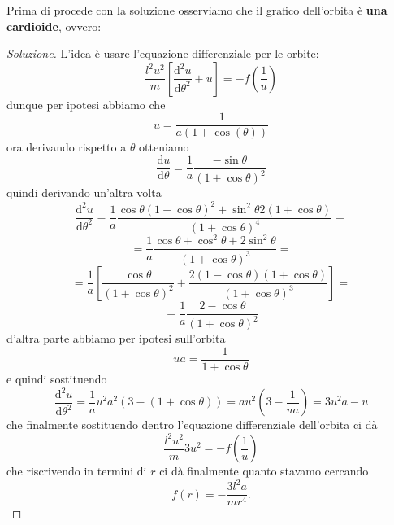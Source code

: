 \documentclass[11pt]{scrartcl}
\newcommand{\dif}{\text{d}}
\begin{document}
	\begin{sol}
		Prima di procede con la soluzione osserviamo che il grafico dell'orbita è \textbf{una cardioide}, ovvero:
		\begin{center}
		\end{center}
		\begin{proof}[Soluzione]
			L'idea è usare l'equazione differenziale per le orbite:
			$$\frac{l^2u^2}{m}\left[\frac{\dif^2 u}{\dif \theta^2}+u\right]=-f\left(\frac{1}{u}\right)$$
			dunque per ipotesi abbiamo che
			$$u=\frac{1}{a(1+\cos(\theta))}$$
			ora derivando rispetto a $\theta$ otteniamo
			$$\frac{\dif u}{\dif \theta}=\frac{1}{a}\frac{-\sin\theta}{\left(1+\cos\theta\right)^2}$$
			quindi derivando un'altra volta 
			$$\frac{\dif^2 u}{\dif \theta^2}=\frac{1}{a}\frac{\cos\theta (1+\cos\theta)^2+\sin^2\theta 2(1+\cos\theta)}{(1+\cos\theta)^4}=$$
			$$=\frac{1}{a}\frac{\cos\theta+\cos^2\theta + 2\sin^2\theta}{(1+\cos\theta)^3}=$$
			$$=\frac{1}{a}\left[\frac{\cos\theta}{(1+\cos\theta)^2}+\frac{2(1-\cos\theta)(1+\cos\theta)}{(1+\cos\theta)^3}\right]=$$
			$$=\frac{1}{a}\frac{2-\cos\theta}{(1+\cos\theta)^2}$$
			d'altra parte abbiamo per ipotesi sull'orbita
			$$ua=\frac{1}{1+\cos\theta}$$
			e quindi sostituendo
			$$\frac{\dif^2 u }{\dif \theta^2}=\frac{1}{a}u^2a^2(3-(1+\cos\theta))=au^2\left(3-\frac{1}{ua}\right)=3u^2a-u$$
			che finalmente sostituendo dentro l'equazione differenziale dell'orbita ci dà
			$$\frac{l^2u^2}{m}3u^2=-f\left(\frac{1}{u}\right)$$
			che riscrivendo in termini di $r$ ci dà finalmente quanto stavamo cercando
			$$f(r)=-\frac{3l^2a}{mr^4}.$$
		\end{proof}
	\end{sol}
\end{document}
